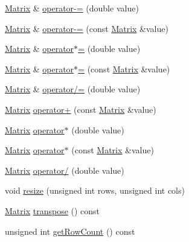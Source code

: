 \begin{DoxyCompactItemize}
\item 
\hyperlink{classopen_mind_1_1math_1_1_matrix}{Matrix} \& \hyperlink{classopen_mind_1_1math_1_1_matrix_abfedb905902c2b10218a6e61980f42fc}{operator-\/=} (double value)
\item 
\hyperlink{classopen_mind_1_1math_1_1_matrix}{Matrix} \& \hyperlink{classopen_mind_1_1math_1_1_matrix_a9137b8be9250fbf25505980ad5f0f539}{operator-\/=} (const \hyperlink{classopen_mind_1_1math_1_1_matrix}{Matrix} \&value)
\item 
\hyperlink{classopen_mind_1_1math_1_1_matrix}{Matrix} \& \hyperlink{classopen_mind_1_1math_1_1_matrix_a2cfce379d6cddcfa26e31b955922c90e}{operator$\ast$=} (double value)
\item 
\hyperlink{classopen_mind_1_1math_1_1_matrix}{Matrix} \& \hyperlink{classopen_mind_1_1math_1_1_matrix_a5ff127cb2653a33f6e659b327e347afc}{operator$\ast$=} (const \hyperlink{classopen_mind_1_1math_1_1_matrix}{Matrix} \&value)
\item 
\hyperlink{classopen_mind_1_1math_1_1_matrix}{Matrix} \& \hyperlink{classopen_mind_1_1math_1_1_matrix_ad7cbc2685d02bed36204c8b40c2f721e}{operator/=} (double value)
\item 
\hyperlink{classopen_mind_1_1math_1_1_matrix}{Matrix} \hyperlink{classopen_mind_1_1math_1_1_matrix_a2718e2c4da026a84d768459939e79089}{operator+} (const \hyperlink{classopen_mind_1_1math_1_1_matrix}{Matrix} \&value)
\item 
\hyperlink{classopen_mind_1_1math_1_1_matrix}{Matrix} \hyperlink{classopen_mind_1_1math_1_1_matrix_a25fc9903b13803b93056f3e823feb835}{operator$\ast$} (double value)
\item 
\hyperlink{classopen_mind_1_1math_1_1_matrix}{Matrix} \hyperlink{classopen_mind_1_1math_1_1_matrix_a152466da10b2bc6d675c6a0cdaeebaa2}{operator$\ast$} (const \hyperlink{classopen_mind_1_1math_1_1_matrix}{Matrix} \&value)
\item 
\hyperlink{classopen_mind_1_1math_1_1_matrix}{Matrix} \hyperlink{classopen_mind_1_1math_1_1_matrix_a3c2f863cb867dc3ee52e9806c04ae32c}{operator/} (double value)
\item 
void \hyperlink{classopen_mind_1_1math_1_1_matrix_a6d44effc5284193d37308b8cb4395130}{resize} (unsigned int rows, unsigned int cols)
\item 
\hyperlink{classopen_mind_1_1math_1_1_matrix}{Matrix} \hyperlink{classopen_mind_1_1math_1_1_matrix_aed8d62933076a5abad1263a99a2cb846}{transpose} () const 
\item 
unsigned int \hyperlink{classopen_mind_1_1math_1_1_matrix_a1f73721fe2824cdacb6f7af157621561}{get\+Row\+Count} () const 

\end{DoxyCompactItemize}
